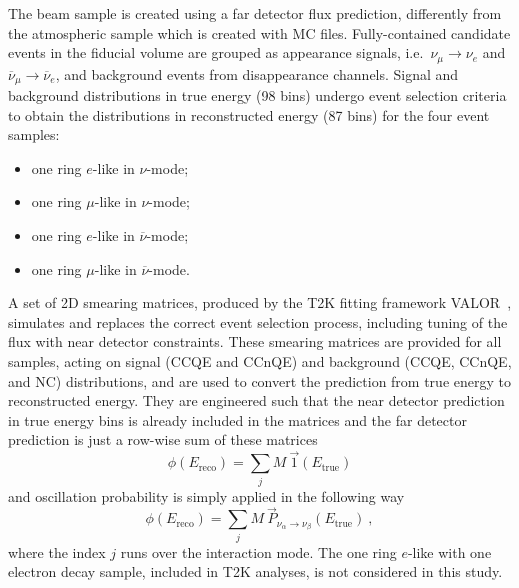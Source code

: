 \documentclass[a4paper, 11pt]{article}
\newcommand{\cj}{\overline}
\begin{document}
The beam sample is created using a far detector flux prediction, differently from the atmospheric sample which is created with MC files.
Fully-contained candidate events in the fiducial volume are grouped %
as appearance signals, i.e.\ $\nu_\mu\to\nu_e$ and $\cj{\nu}_\mu\to\cj{\nu}_e$, %
and background events from disappearance channels.
Signal and background distributions in true energy (98 bins) undergo event selection criteria %
to obtain the distributions in reconstructed energy (87 bins) for the four event samples: %
\begin{multicols}{2}
	\begin{itemize}
		\item one ring $e$-like in $\nu$-mode; %
		\item one ring $\mu$-like in $\nu$-mode; %
		\item one ring $e$-like in $\cj{\nu}$-mode; %
		\item one ring $\mu$-like in $\cj{\nu}$-mode.
	\end{itemize}
\end{multicols}
A set of 2D smearing matrices, produced by the T2K fitting framework VALOR~\cite{VALOR}, %
simulates and replaces the correct event selection process, including tuning of the flux with near detector constraints.
These smearing matrices are provided for all samples, acting on signal (CCQE and CCnQE) %
and background (CCQE, CCnQE, and NC) distributions, and are used to convert the prediction from true energy to reconstructed energy.
They are engineered such that the near detector prediction in true energy bins is already included in the matrices %
and the far detector prediction is just a row-wise sum of these matrices
\begin{equation}
	\phi(E_\text{reco}) = \sum_j M\ \vec{1}(E_\text{true})
\end{equation}
and oscillation probability is simply applied in the following way
\begin{equation}
	\phi(E_\text{reco}) = \sum_j M\ \vec{P}_{\nu_\alpha \to \nu_\beta}(E_\text{true})\ ,
\end{equation}
where the index $j$ runs over the interaction mode.
The one ring $e$-like with one electron decay sample, included in T2K analyses, is not considered in this study.
\end{document}
